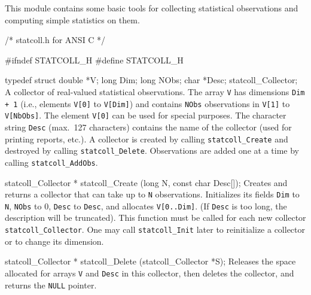         
This module contains some basic tools for collecting statistical 
observations and computing simple statistics on them.

\code
\hide
/* statcoll.h  for ANSI C  */

#ifndef STATCOLL_H
#define STATCOLL_H
\endhide
\endcode



\code

typedef struct {
   double *V;
   long Dim;
   long NObs;
   char *Desc;
} statcoll_Collector;
\endcode
 \tab  A collector of real-valued statistical observations.
  The array {\tt V} has dimensions {\tt Dim + 1} (i.e., elements
  {\tt V[0]} to {\tt V[Dim]}) and contains {\tt NObs} observations
  in {\tt V[1]} to {\tt V[NbObs]}.  
  The element {\tt V[0]} can be used for special purposes.
  The character string {\tt Desc} (max.\ 127 characters) contains 
  the name of the collector (used for printing reports, etc.).
  A collector is created by calling 
  {\tt statcoll\_Create} and destroyed by calling {\tt statcoll\_Delete}.
  Observations are added one at a time by calling {\tt statcoll\_AddObs}.
 \endtab




\code

statcoll_Collector * statcoll_Create (long N, const char Desc[]);
\endcode
 \tab
 Creates and returns a collector that can take up to {\tt N} 
 observations.  Initializes its fields {\tt Dim} to {\tt N}, 
 {\tt NObs} to 0, {\tt Desc} to {\tt Desc}, and allocates
 {\tt V[0..Dim]}.  
 (If {\tt Desc} is too long, the description will be truncated).
 This function must be called for each new collector
 {\tt statcoll\_Collector}. One may call {\tt statcoll\_Init} later
 to reinitialize a collector or to change its dimension.
 \endtab
\code


statcoll_Collector * statcoll_Delete (statcoll_Collector *S);
\endcode
 \tab
  Releases the space allocated for arrays {\tt V} and {\tt Desc}
  in this collector, then deletes the collector, and returns the
  {\tt NULL} pointer.
\endtab
\code


